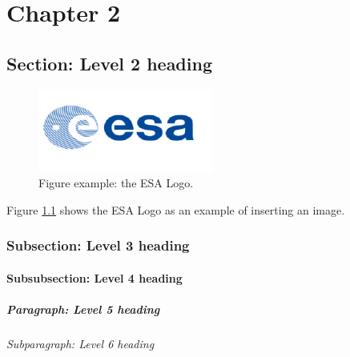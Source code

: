 
\chapter{Chapter 2}

\section{Section: Level 2 heading}

\begin{figure}[h!]
  \centering
  \includegraphics[width=0.5\linewidth]{latex-template-EO4BSIS/styles/images/LogoEsa.png}
  \caption{Figure example: the ESA Logo.}
  \label{fig:logo}
\end{figure}

Figure \ref{fig:logo} shows the ESA Logo as an example of inserting an image.

\subsection{Subsection: Level 3 heading}
\subsubsection{Subsubsection: Level 4 heading}
\paragraph{Paragraph: Level 5 heading}
\subparagraph{Subparagraph: Level 6 heading}

